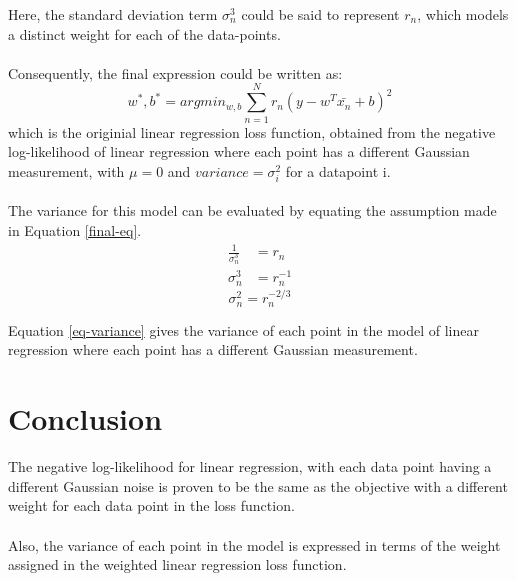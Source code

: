 \documentclass[a4paper]{article}
\begin{document}
Here, the standard deviation term $\sigma_n^3$ could be said to represent $r_n$, which models a distinct weight for each of the data-points.
\\
\\
Consequently, the final expression could be written as:\\
\begin{equation}
\label{final-eq}
	w^*, b^* = argmin_{w,b} \sum_{n=1}^{N} r_n (y - w^T\bar{x_n} + b)^2
\end{equation}
which is the originial linear regression loss function, obtained from the negative log-likelihood of linear regression where each point has a different Gaussian measurement, with $\mu = 0$ and $variance = \sigma_i^2$ for a datapoint i.
\\
\\
The variance for this model can be evaluated by equating the assumption made in Equation \ref{final-eq}.
\begin{align*}
	\frac{1}{\sigma_n^3} &= r_n\\
	\sigma_n^3 &= r_n^{-1}
\end{align*}
\begin{equation}
\label{eq-variance}
	\sigma_n^2 = r_n^{-2/3}
\end{equation}

Equation \ref{eq-variance} gives the variance of each point in the model of linear regression where each point has a different Gaussian measurement.

\section{Conclusion}
The negative log-likelihood for linear regression, with each data point having a different Gaussian noise is proven to be the same as the objective with a different weight for each data point in the loss function.\\
\\
Also, the variance of each point in the model is expressed in terms of the weight assigned in the weighted linear regression loss function.
\end{document}
